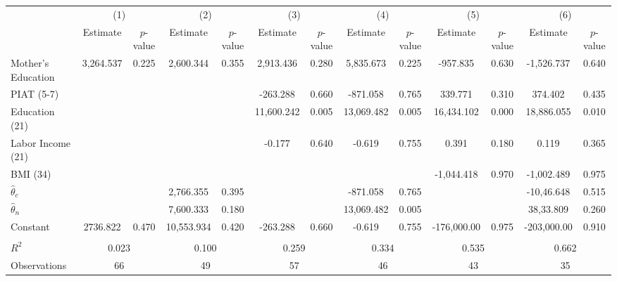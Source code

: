\begin{tabular}{lcccccccccccc} \toprule
 & \multicolumn{2}{c}{(1)}  &  \multicolumn{2}{c}{(2)}  &  \multicolumn{2}{c}{(3)}  &  \multicolumn{2}{c}{(4)}  & \multicolumn{2}{c}{(5)} & \multicolumn{2}{c}{(6)} \\  
 & Estimate & $p$-value & Estimate & $p$-value & Estimate & $p$-value & Estimate & $p$-value & Estimate & $p$-value & Estimate & $p$-value \\ \midrule
Mother's Education &  3,264.537 &     0.225 &  2,600.344 &     0.355 &  2,913.436 &     0.280 &  5,835.673 &     0.225 &  -957.835 &     0.630 & -1,526.737 &     0.640 \\  
PIAT (5-7) &         &         &         &         &  -263.288 &     0.660 &  -871.058 &     0.765 &   339.771 &     0.310 &   374.402 &     0.435 \\  
Education (21) &         &         &         &         & 11,600.242 &     0.005 & 13,069.482 &     0.005 & 16,434.102 &     0.000 & 18,886.055 &     0.010 \\  
Labor Income (21) &         &         &         &         &    -0.177 &     0.640 &    -0.619 &     0.755 &     0.391 &     0.180 &     0.119 &     0.365 \\  
BMI (34) &         &         &         &         &         &         &         &         & -1,044.418 &     0.970 & -1,002.489 &     0.975 \\  
$\hat{\theta}_{c}$ &         &         &  2,766.355 &     0.395 &         &         &  -871.058 &     0.765 &         &         & -10,46.648 &     0.515 \\  
$\hat{\theta}_{n}$  &         &         &  7,600.333 &     0.180 &         &         & 13,069.482 &     0.005 &         &         &  38,33.809 &     0.260 \\  
Constant &  2736.822 &     0.470 & 10,553.934 &     0.420 &  -263.288 &     0.660 &    -0.619 &     0.755 & -176,000.00 &     0.975 & -203,000.00 &     0.910 \\  \\ \midrule 
$R^2$ &     \multicolumn{2}{c}{0.023} &     \multicolumn{2}{c}{0.100} &     \multicolumn{2}{c}{0.259}  &     \multicolumn{2}{c}{0.334}  &     \multicolumn{2}{c}{0.535} &     \multicolumn{2}{c}{0.662}  \\  
Observations &    \multicolumn{2}{c}{66}  &    \multicolumn{2}{c}{49}  &    \multicolumn{2}{c}{57} &    \multicolumn{2}{c}{46} &    \multicolumn{2}{c}{43}  &    \multicolumn{2}{c}{35} \\ \bottomrule \end{tabular}
